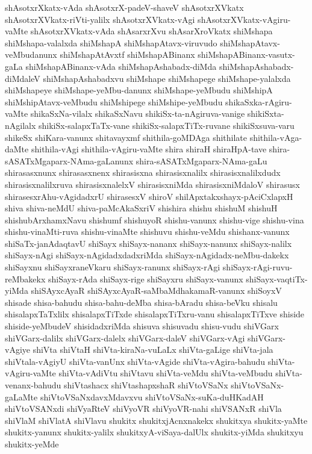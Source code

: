 {shAsotxrXkatx-vAda
shAsotxrX-padeV-shaveV
shAsotxrXVkatx
shAsotxrXVkatx-riVti-yalilx
shAsotxrXVkatx-vAgi
shAsotxrXVkatx-vAgiru-vaMte
shAsotxrXVkatx-vAda
shAsarxrXvu
shAsarXroVkatx
shiMshapa
shiMshapa-valalxda
shiMshapA
shiMshapAtavx-viruvudo
shiMshapAtavx-veMbudanunx
shiMshapAtAvxtf
shiMshapABinanx
shiMshapABinanx-vasutx-gaLa
shiMshapABinanx-vAda
shiMshapAshabadx-diMda
shiMshapAshabadx-diMdaleV
shiMshapAshabadxvu
shiMshape
shiMshapege
shiMshape-yalalxda
shiMshapeye
shiMshape-yeMbu-danunx
shiMshape-yeMbudu
shiMshipA
shiMshipAtavx-veMbudu
shiMshipege
shiMshipe-yeMbudu
shikaSxka-rAgiru-vaMte
shikaSxNa-vilalx
shikaSxNavu
shikiSx-ta-nAgiruva-vanige
shikiSxta-nAgilalx
shikiSx-salapxTaTx-vane
shikiSx-salapxTiTx-ruvane
shikiSxsuva-varu
shikeSx
shiKara-vanunx
shitavayxmf
shithila-goMDAga
shithilate
shithila-vAga-daMte
shithila-vAgi
shithila-vAgiru-vaMte
shira
shiraH
shiraHpA-tave
shira-sASATxMgaparx-NAma-gaLanunx
shira-sASATxMgaparx-NAma-gaLu
shirasasxnunx
shirasasxnenx
shirasisxna
shirasisxnalilx
shirasisxnalilxdudx
shirasisxnalilxruva
shirasisxnalelxV
shirasisxniMda
shirasisxniMdaloV
shirasusx
shirasesxrAhu-vAgidadxrU
shirasesxV
shiroV
shilApxtakxshayx-pAciCxlapxH
shiva
shiva-neMdU
shiva-paMcAkaSxriV
shishira
shishu
shishuM
shishuH
shishubArxhamxNavu
shishumf
shishuyoR
shishu-vanunx
shishu-vige
shishu-vina
shishu-vinaMti-ruva
shishu-vinaMte
shishuvu
shishu-veMdu
shishanx-vanunx
shiSaTx-janAdaqtavU
shiSayx
shiSayx-nananx
shiSayx-nanunx
shiSayx-nalilx
shiSayx-nAgi
shiSayx-nAgidadxdadxriMda
shiSayx-nAgidadx-neMbu-dakekx
shiSayxnu
shiSayxraneVkaru
shiSayx-ranunx
shiSayx-rAgi
shiSayx-rAgi-ruvu-reMbakekx
shiSayx-rAda
shiSayx-rige
shiSayxru
shiSayx-vanunx
shiSayx-vaqtiTx-yiMda
shiSAyxcAyaR
shiSAyxcAyaR-saMbaMdhakamaR-vanunx
shiSoyxV
shisade
shisa-bahudu
shisa-bahu-deMba
shisa-bAradu
shisa-beVku
shisalu
shisalapxTaTxlilx
shisalapxTiTxde
shisalapxTiTxru-vanu
shisalapxTiTxve
shiside
shiside-yeMbudeV
shisidadxriMda
shisuva
shisuvadu
shisu-vudu
shiVGarx
shiVGarx-dalilx
shiVGarx-dalelx
shiVGarx-daleV
shiVGarx-vAgi
shiVGarx-vAgiye
shiVta
shiVtaH
shiVta-kiraNa-vuLaLx
shiVta-gaLige
shiVta-jala
shiVtala-vAgiyU
shiVta-vanUnx
shiVta-vAgide
shiVta-vAgira-bahudu
shiVta-vAgiru-vaMte
shiVta-vAdiVtu
shiVtavu
shiVta-veMdu
shiVta-veMbudu
shiVta-venanx-bahudu
shiVtashacx
shiVtashapxshaR
shiVtoVSaNx
shiVtoVSaNx-gaLaMte
shiVtoVSaNxdavxMdavxvu
shiVtoVSaNx-suKa-duHKadAH
shiVtoVSANxdi
shiVyaRteV
shiVyoVR
shiVyoVR-nahi
shiVSANxR
shiVla
shiVlaM
shiVlatA
shiVlavu
shukitx
shukitxjAcnxnakekx
shukitxya
shukitx-yaMte
shukitx-yanunx
shukitx-yalilx
shukitxyA-viSaya-dalUlx
shukitx-yiMda
shukitxyu
shukitx-yeMde
}
